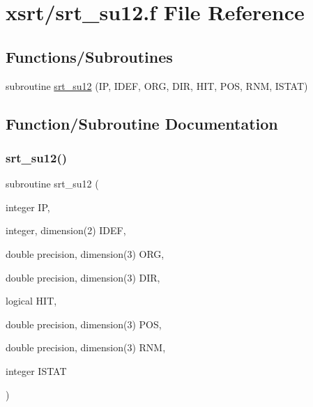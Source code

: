 \hypertarget{srt__su12_8f}{}\section{xsrt/srt\+\_\+su12.f File Reference}
\label{srt__su12_8f}
\subsection*{Functions/\+Subroutines}
\begin{DoxyCompactItemize}
\item 
subroutine \hyperlink{srt__su12_8f_ad963814bdd8e58a720254f3bcde1ce60}{srt\+\_\+su12} (IP, I\+D\+EF, O\+RG, D\+IR, H\+IT, P\+OS, R\+NM, I\+S\+T\+AT)
\end{DoxyCompactItemize}


\subsection{Function/\+Subroutine Documentation}
\mbox{\label{srt__su12_8f_ad963814bdd8e58a720254f3bcde1ce60}} 
\subsubsection{\texorpdfstring{srt\+\_\+su12()}{srt\_su12()}}
{\footnotesize\ttfamily subroutine srt\+\_\+su12 (\begin{DoxyParamCaption}\item[{integer}]{IP,  }\item[{integer, dimension(2)}]{I\+D\+EF,  }\item[{double precision, dimension(3)}]{O\+RG,  }\item[{double precision, dimension(3)}]{D\+IR,  }\item[{logical}]{H\+IT,  }\item[{double precision, dimension(3)}]{P\+OS,  }\item[{double precision, dimension(3)}]{R\+NM,  }\item[{integer}]{I\+S\+T\+AT }\end{DoxyParamCaption})}

